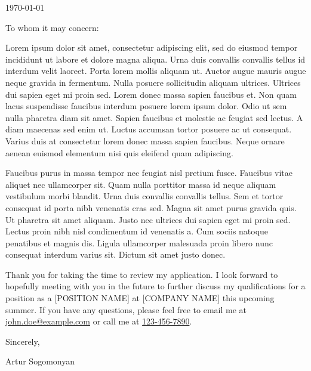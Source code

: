 \documentclass{ExpressiveCoverLetter}
\begin{document}
\coverletterheader[
    firstname=Artur,
    middleinitial=N,
    lastname=Sogomonyan,
    email=arthur.sogomonyan@gmail.com,
    phone=+43 677 64114581,
    linkedin=artur-sogomonyan,
    github=PropovedNik007,
    city=Vienna,
    state=Austria
]

\vspace{0.25in}
\today
\vspace{0.15in}


To whom it may concern:

Lorem ipsum dolor sit amet, consectetur adipiscing elit, sed do eiusmod
tempor incididunt ut labore et dolore magna aliqua. Urna duis convallis
convallis tellus id interdum velit laoreet. Porta lorem mollis aliquam
ut. Auctor augue mauris augue neque gravida in fermentum. Nulla posuere
sollicitudin aliquam ultrices. Ultrices dui sapien eget mi proin sed.
Lorem donec massa sapien faucibus et. Non quam lacus suspendisse
faucibus interdum posuere lorem ipsum dolor. Odio ut sem nulla pharetra
diam sit amet. Sapien faucibus et molestie ac feugiat sed lectus. A
diam maecenas sed enim ut. Luctus accumsan tortor posuere ac ut
consequat. Varius duis at consectetur lorem donec massa sapien
faucibus. Neque ornare aenean euismod elementum nisi quis eleifend quam
adipiscing.

Faucibus purus in massa tempor nec feugiat nisl pretium fusce. Faucibus
vitae aliquet nec ullamcorper sit. Quam nulla porttitor massa id neque
aliquam vestibulum morbi blandit. Urna duis convallis convallis tellus.
Sem et tortor consequat id porta nibh venenatis cras sed. Magna sit
amet purus gravida quis. Ut pharetra sit amet aliquam. Justo nec
ultrices dui sapien eget mi proin sed. Lectus proin nibh nisl
condimentum id venenatis a. Cum sociis natoque penatibus et magnis dis.
Ligula ullamcorper malesuada proin libero nunc consequat interdum
varius sit. Dictum sit amet justo donec.

Thank you for taking the time to review my application. I look forward
to hopefully meeting with you in the future to further discuss my
qualifications for a position as a [POSITION NAME] at [COMPANY NAME]
this upcoming summer. If you have any questions, please feel free to
email me at \href{mailto:john.doe@example.com}{john.doe@example.com} or
call me at \href{tel:+1-123-456-7890}{123-456-7890}.

Sincerely,

\vspace{.15in}

Artur Sogomonyan
\end{document}
